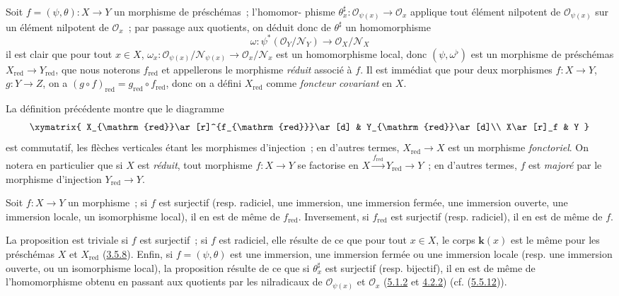 \begin{env}[5.1.5]
\label{I.5.1.5-fr}
Soit $f=(\psi,\theta):X\to Y$ un morphisme de préschémas~; l'homomor-
phisme $\theta_x^\sharp:\mathscr{O}_{\psi(x)}\to\mathscr{O}_x$ applique tout
élément nilpotent de $\mathscr{O}_{\psi(x)}$ sur un élément nilpotent de
$\mathscr{O}_x$~; par passage aux quotients, on déduit donc de $\theta^\sharp$
un homomorphisme
\[
  \omega:\psi^*(\mathscr{O}_Y/\mathscr{N}_Y)
  \longrightarrow \mathscr{O}_X/\mathscr{N}_X
\]
il est clair que pour tout $x\in X$,
$\omega_x:\mathscr{O}_{\psi(x)}/\mathscr{N}_{\psi(x)}
\to\mathscr{O}_x/\mathscr{N}_x$ est un homomorphisme local, donc
$(\psi,\omega^\flat)$ est un morphisme de préschémas
$X_{\mathrm{red}}\to Y_{\mathrm{red}}$, que nous noterons $f_{\mathrm{red}}$
et appellerons le morphisme \emph{réduit} associé à $f$. Il est immédiat que
pour deux morphismes $f:X\to Y$, $g:Y\to Z$, on a
$(g\circ f)_{\mathrm{red}}=g_{\mathrm{red}}\circ f_{\mathrm{red}}$, donc on a
défini $X_{\mathrm{red}}$ comme \emph{foncteur covariant} en $X$.

La définition précédente montre que le diagramme
\[
  \xymatrix{
    X_{\mathrm{red}}\ar[r]^{f_{\mathrm{red}}}\ar[d] &
    Y_{\mathrm{red}}\ar[d]\\
    X\ar[r]_f & Y
  }
\]
est commutatif, les flèches verticales étant les morphismes d'injection~; en
d'autres termes, $X_{\mathrm{red}}\to X$ est un morphisme \emph{fonctoriel}.
On notera en particulier que si $X$ est \emph{réduit}, tout morphisme
$f:X\to Y$ se factorise en
$X\xrightarrow{f_{\mathrm{red}}}Y_{\mathrm{red}}\to Y$~; en d'autres termes,
$f$ est \emph{majoré} par le morphisme d'injection
$Y_{\mathrm{red}}\to Y$.
\end{env}

\begin{proposition}[5.1.6]
\label{I.5.1.6-fr}
Soit $f:X\to Y$ un morphisme~; si $f$ est surjectif (\textup{resp.} radiciel, une
immersion, une immersion fermée, une immersion ouverte, une immersion locale,
un isomorphisme local), il en est de même de $f_{\mathrm{red}}$. Inversement,
si $f_{\mathrm{red}}$ est surjectif (\textup{resp.} radiciel), il en est de même de
$f$.
\end{proposition}

La proposition est triviale si $f$ est surjectif~; si $f$ est radiciel, elle
résulte de ce que pour tout $x\in X$, le corps $\boldsymbol{k}(x)$ est le même pour les
préschémas $X$ et $X_{\mathrm{red}}$
(\hyperref[I.3.5.8-fr]{3.5.8}). Enfin, si $f=(\psi,\theta)$ est une immersion,
une immersion fermée ou une immersion locale (resp. une immersion ouverte, ou
un isomorphisme local), la proposition résulte de ce que si
$\theta_x^\sharp$ est surjectif (resp. bijectif), il en est de même de
l'homomorphisme obtenu en passant aux quotients par les nilradicaux de
$\mathscr{O}_{\psi(x)}$ et $\mathscr{O}_x$
(\hyperref[I.5.1.2-fr]{5.1.2} et \hyperref[I.4.2.2-fr]{4.2.2})
(cf. (\hyperref[I.5.5.12-fr]{5.5.12})).

